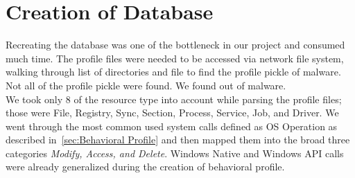 
\section{Creation of Database}
\label{sec:Creation of Database}
Recreating the database was one of the bottleneck in our project and consumed much time.
The profile files were needed to be accessed via network file system, walking through list of directories and file to find the profile pickle of malware.
Not all of the profile pickle were found. We found \emph{\gettotalmalwareii{}} out of \emph{\gettotalmalwarei{}} malware.\\
We took only 8 of the resource type into account while parsing the profile files; those were File, Registry, Sync, Section, Process, Service, Job, and Driver.
We went through the most common used system calls defined as OS Operation as described in~\autoref{sec:Behavioral Profile} and then mapped them into the broad three categories \emph{Modify, Access, and Delete}.
Windows Native and Windows API calls were already generalized during the creation of behavioral profile.

